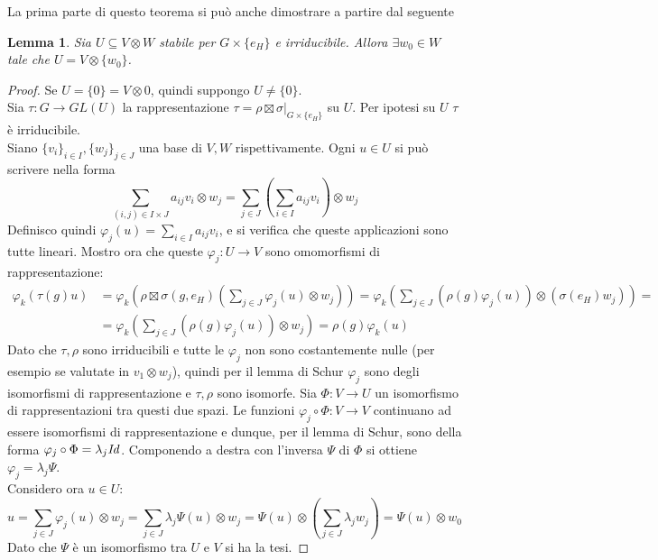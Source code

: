 \documentclass[11pt]{article}
\theoremstyle{plain}
\newtheorem{lemma}[thm]{Lemma}
\theoremstyle{definition}
\theoremstyle{remark}
\begin{document}
La prima parte di questo teorema si può anche dimostrare a partire dal seguente
\begin{lemma}
	Sia $U\subseteq V\otimes W$ stabile per $G\times\lbrace e_H\rbrace$ e irriducibile. Allora $\exists w_0\in W$ tale che $U=V\otimes\lbrace w_0\rbrace$.
\end{lemma}
\begin{proof}
	Se $U=\lbrace0\rbrace = V\otimes 0$, quindi suppongo $U\neq\lbrace0\rbrace$.\\
	Sia $\tau:G\to GL(U)$ la rappresentazione $\tau = \left.\rho\boxtimes\sigma\right|_{G\times\lbrace e_H\rbrace}$ su $U$. Per ipotesi su $U$ $\tau$ è irriducibile.\\
	Siano $\lbrace v_i\rbrace_{i\in I}, \lbrace w_j\rbrace_{j\in J}$ una base di $V, W$ rispettivamente. Ogni $u\in U$ si può scrivere nella forma
	\[\sum_{(i, j)\in I\times J} a_{ij}v_i\otimes w_j = \sum_{j\in J} \left(\sum_{i\in I} a_{ij}v_i\right) \otimes w_j\]
	Definisco quindi $\varphi_j(u) = \sum_{i\in I}a_{ij}v_i$, e si verifica che queste applicazioni sono tutte lineari. Mostro ora che queste $\varphi_j:U\to V$ sono omomorfismi di rappresentazione:
	\begin{align*}
	\varphi_k(\tau(g)u) &= \varphi_k(\rho\boxtimes\sigma(g, e_H)(\sum_{j\in J} \varphi_j(u)\otimes w_j )) = \varphi_k( \sum_{j\in J}(\rho(g)\varphi_j(u))\otimes(\sigma(e_H)w_j) )=\\
	&= \varphi_k( \sum_{j\in J}(\rho(g)\varphi_j(u))\otimes w_j ) = \rho(g)\varphi_k(u)
	\end{align*}
	Dato che $\tau, \rho$ sono irriducibili e tutte le $\varphi_j$ non sono costantemente nulle (per esempio se valutate in $v_1\otimes w_j$), quindi per il lemma di Schur $\varphi_j$ sono degli isomorfismi di rappresentazione e $\tau, \rho$ sono isomorfe. Sia $\Phi:V\to U$ un isomorfismo di rappresentazioni tra questi due spazi. Le funzioni $\varphi_j\circ\Phi:V\to V$ continuano ad essere isomorfismi di rappresentazione e dunque, per il lemma di Schur, sono della forma $\varphi_j\circ\Phi = \lambda_j \it{Id}$. Componendo a destra con l'inversa $\Psi$ di $\Phi$ si ottiene $\varphi_j = \lambda_j \Psi$.\\
	Considero ora $u\in U$:
	\[
	u=\sum_{j\in J} \varphi_j(u)\otimes w_j = \sum_{j\in J} \lambda_j \Psi(u)\otimes w_j = \Psi(u)\otimes\left(\sum_{j\in J} \lambda_j w_j\right) = \Psi(u)\otimes w_0
	\]
	Dato che $\Psi$ è un isomorfismo tra $U$ e $V$ si ha la tesi.
\end{proof}
\end{document}
